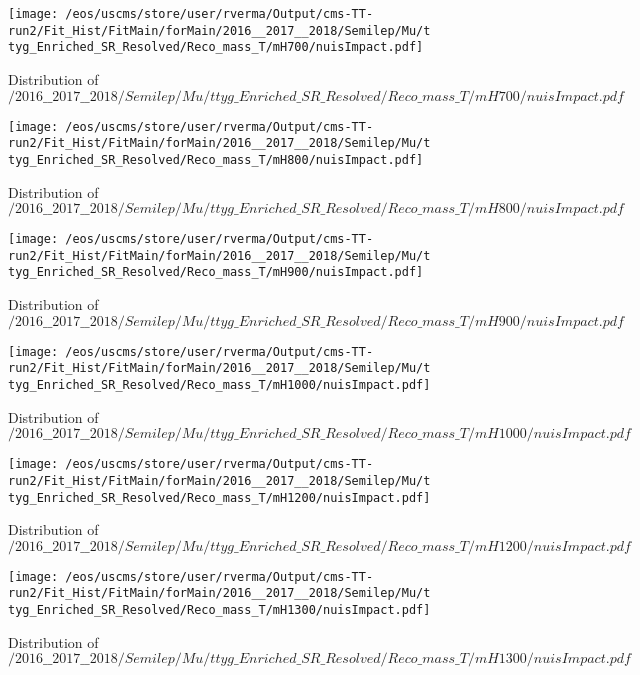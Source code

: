 \begin{figure}
\centering
\texttt{[image: /eos/uscms/store/user/rverma/Output/cms-TT-run2/Fit\_Hist/FitMain/forMain/2016\_\_2017\_\_2018/Semilep/Mu/ttyg\_Enriched\_SR\_Resolved/Reco\_mass\_T/mH700/nuisImpact.pdf]}
\caption{Distribution of $/2016\_\_2017\_\_2018/Semilep/Mu/ttyg\_Enriched\_SR\_Resolved/Reco\_mass\_T/mH700/nuisImpact.pdf$}
\end{figure}

\begin{figure}
\centering
\texttt{[image: /eos/uscms/store/user/rverma/Output/cms-TT-run2/Fit\_Hist/FitMain/forMain/2016\_\_2017\_\_2018/Semilep/Mu/ttyg\_Enriched\_SR\_Resolved/Reco\_mass\_T/mH800/nuisImpact.pdf]}
\caption{Distribution of $/2016\_\_2017\_\_2018/Semilep/Mu/ttyg\_Enriched\_SR\_Resolved/Reco\_mass\_T/mH800/nuisImpact.pdf$}
\end{figure}

\begin{figure}
\centering
\texttt{[image: /eos/uscms/store/user/rverma/Output/cms-TT-run2/Fit\_Hist/FitMain/forMain/2016\_\_2017\_\_2018/Semilep/Mu/ttyg\_Enriched\_SR\_Resolved/Reco\_mass\_T/mH900/nuisImpact.pdf]}
\caption{Distribution of $/2016\_\_2017\_\_2018/Semilep/Mu/ttyg\_Enriched\_SR\_Resolved/Reco\_mass\_T/mH900/nuisImpact.pdf$}
\end{figure}

\begin{figure}
\centering
\texttt{[image: /eos/uscms/store/user/rverma/Output/cms-TT-run2/Fit\_Hist/FitMain/forMain/2016\_\_2017\_\_2018/Semilep/Mu/ttyg\_Enriched\_SR\_Resolved/Reco\_mass\_T/mH1000/nuisImpact.pdf]}
\caption{Distribution of $/2016\_\_2017\_\_2018/Semilep/Mu/ttyg\_Enriched\_SR\_Resolved/Reco\_mass\_T/mH1000/nuisImpact.pdf$}
\end{figure}

\begin{figure}
\centering
\texttt{[image: /eos/uscms/store/user/rverma/Output/cms-TT-run2/Fit\_Hist/FitMain/forMain/2016\_\_2017\_\_2018/Semilep/Mu/ttyg\_Enriched\_SR\_Resolved/Reco\_mass\_T/mH1200/nuisImpact.pdf]}
\caption{Distribution of $/2016\_\_2017\_\_2018/Semilep/Mu/ttyg\_Enriched\_SR\_Resolved/Reco\_mass\_T/mH1200/nuisImpact.pdf$}
\end{figure}

\begin{figure}
\centering
\texttt{[image: /eos/uscms/store/user/rverma/Output/cms-TT-run2/Fit\_Hist/FitMain/forMain/2016\_\_2017\_\_2018/Semilep/Mu/ttyg\_Enriched\_SR\_Resolved/Reco\_mass\_T/mH1300/nuisImpact.pdf]}
\caption{Distribution of $/2016\_\_2017\_\_2018/Semilep/Mu/ttyg\_Enriched\_SR\_Resolved/Reco\_mass\_T/mH1300/nuisImpact.pdf$}
\end{figure}


